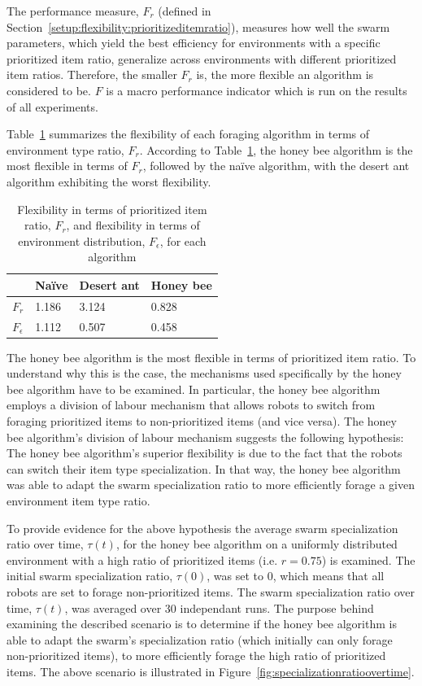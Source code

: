 \documentclass[preprint,12pt]{elsarticle}
\begin{document}
The performance measure, $F_r$ (defined in Section~\ref{setup:flexibility:prioritizeditemratio}), measures how well the swarm parameters, which yield the best efficiency for environments with a specific prioritized item ratio, generalize across environments with different prioritized item ratios. Therefore, the smaller $F_r$ is, the more flexible an algorithm is considered to be. $F$ is a macro performance indicator which is run on the results of all experiments. 

Table~\ref{table:flexibility} summarizes the flexibility of each foraging algorithm in terms of environment type ratio, $F_r$. According to Table~\ref{table:flexibility}, the honey bee algorithm is the most flexible in terms of $F_r$, followed by the na\"ive algorithm, with the desert ant algorithm exhibiting the worst flexibility. 

 
\begin{table}[!htbp]
\centering
\caption{Flexibility in terms of prioritized item ratio, $F_r$, and flexibility in terms of environment distribution, $F_\epsilon$, for each algorithm}
\label{table:flexibility}
\begin{tabular}{@{}llll@{}}
\toprule
\textbf{}         & Na\"ive         & Desert ant        & Honey bee         \\ \midrule
\textbf{$F_r$}    & 1.186 & 3.124     & 0.828    \\ \midrule
\textbf{$F_\epsilon$} & 1.112 & 0.507 & 0.458 
\end{tabular}
\end{table}

The honey bee algorithm is the most flexible in terms of prioritized item ratio. To understand why this is the case, the mechanisms used specifically by the honey bee algorithm have to be examined. In particular, the honey bee algorithm employs a division of labour mechanism that allows robots to switch from foraging prioritized items to non-prioritized items (and vice versa). The honey bee algorithm's division of labour mechanism suggests the following hypothesis: The honey bee algorithm's superior flexibility is due to the fact that the robots can switch their item type specialization. In that way, the honey bee algorithm was able to adapt the swarm specialization ratio to more efficiently forage a given environment item type ratio.

To provide evidence for the above hypothesis the average swarm specialization ratio over time, $\tau(t)$, for the honey bee algorithm on a uniformly distributed environment with a high ratio of prioritized items (i.e. $r = 0.75$) is examined. The initial swarm specialization ratio, $\tau(0)$, was set to 0, which means that all robots are set to forage non-prioritized items. The swarm specialization ratio over time, $\tau(t)$, was averaged over 30 independant runs. The purpose behind examining the described scenario is to determine if the honey bee algorithm is able to adapt the swarm's specialization ratio (which initially can only forage non-prioritized items), to more efficiently forage the high ratio of prioritized items. The above scenario is illustrated in Figure~\ref{fig:specializationratioovertime}. 
\end{document}
